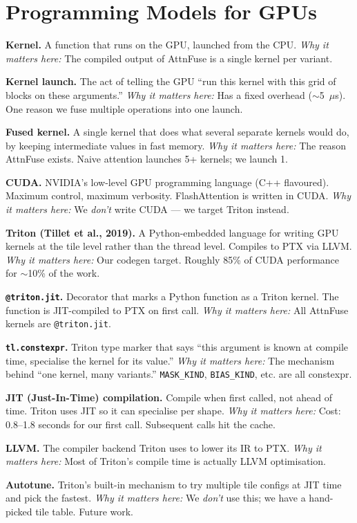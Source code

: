 \documentclass[11pt]{article}
\newcommand{\termw}[3]{%
  \par\smallskip
  \noindent\textbf{\color{blue!50!black}#1.} #2 \emph{\color{black!60}Why it matters here:} #3\par
}
\begin{document}
\section{Programming Models for GPUs}

\termw{Kernel}
{A function that runs on the GPU, launched from the CPU.}
{The compiled output of AttnFuse is a single kernel per variant.}

\termw{Kernel launch}
{The act of telling the GPU ``run this kernel with this grid of blocks
on these arguments.''}
{Has a fixed overhead ($\sim$5~$\mu$s). One reason we fuse multiple
operations into one launch.}

\termw{Fused kernel}
{A single kernel that does what several separate kernels would do, by
keeping intermediate values in fast memory.}
{The reason AttnFuse exists. Naive attention launches 5+ kernels; we
launch 1.}

\termw{CUDA}
{NVIDIA's low-level GPU programming language (C++ flavoured). Maximum
control, maximum verbosity. FlashAttention is written in CUDA.}
{We \emph{don't} write CUDA --- we target Triton instead.}

\termw{Triton (Tillet et al., 2019)}
{A Python-embedded language for writing GPU kernels at the tile level
rather than the thread level. Compiles to PTX via LLVM.}
{Our codegen target. Roughly 85\% of CUDA performance for $\sim$10\% of
the work.}

\termw{\texttt{@triton.jit}}
{Decorator that marks a Python function as a Triton kernel. The function
is JIT-compiled to PTX on first call.}
{All AttnFuse kernels are \texttt{@triton.jit}.}

\termw{\texttt{tl.constexpr}}
{Triton type marker that says ``this argument is known at compile time,
specialise the kernel for its value.''}
{The mechanism behind ``one kernel, many variants.'' \texttt{MASK\_KIND},
\texttt{BIAS\_KIND}, etc. are all constexpr.}

\termw{JIT (Just-In-Time) compilation}
{Compile when first called, not ahead of time. Triton uses JIT so it can
specialise per shape.}
{Cost: 0.8--1.8 seconds for our first call. Subsequent calls hit the cache.}

\termw{LLVM}
{The compiler backend Triton uses to lower its IR to PTX.}
{Most of Triton's compile time is actually LLVM optimisation.}

\termw{Autotune}
{Triton's built-in mechanism to try multiple tile configs at JIT time
and pick the fastest.}
{We \emph{don't} use this; we have a hand-picked tile table. Future work.}
\end{document}
